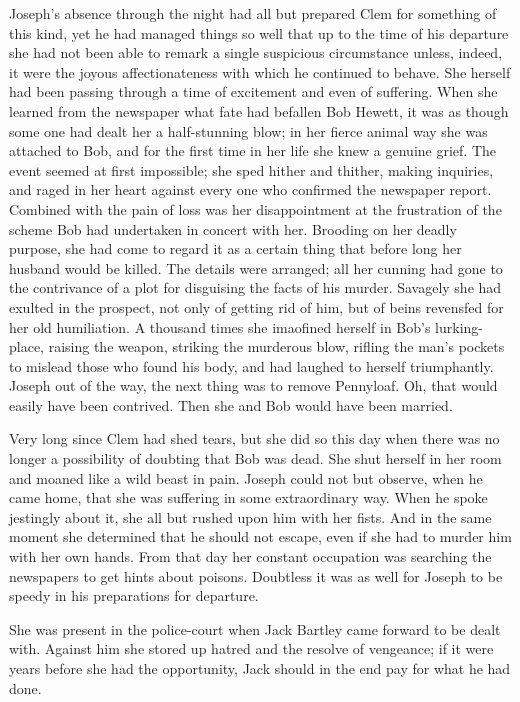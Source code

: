 Joseph's absence through the night had all but prepared Clem for
something of this kind, yet he had managed things so well that up to the
time of his departure she had not been able to remark a single
suspicious circumstance {}unless, indeed, it were the joyous
affectionateness with which he continued to behave. She herself had been
passing through a time of excitement and even of suffering. When she
learned from the newspaper what fate had befallen Bob Hewett, it was as
though some one had dealt her a half-stunning blow; in her fierce animal
way she was attached to Bob, and for the first time in her life she knew
a genuine grief. The event seemed at first impossible; she sped hither
and thither, making inquiries, and raged in her heart against every one
who confirmed the newspaper report. Combined with the pain of loss was
her disappointment at the frustration of the scheme Bob had undertaken
in concert with her. Brooding on her deadly purpose, she had come to
regard it as a certain thing that before long her husband would be
killed. The details were arranged; all her cunning had gone to the
contrivance of a plot for disguising the facts of his murder. Savagely
she had exulted in the prospect, not only of getting rid of him, but of
beins revensfed for her old humiliation. A thousand times she imaofined
herself in Bob's lurking-place, raising the weapon, {}striking the
murderous blow, rifling the man's pockets to mislead those who found his
body, and had laughed to herself triumphantly. Joseph out of the way,
the next thing was to remove Pennyloaf. Oh, that would easily have been
contrived. Then she and Bob would have been married.

Very long since Clem had shed tears, but she did so this day when there
was no longer a possibility of doubting that Bob was dead. She shut
herself in her room and moaned like a wild beast in pain. Joseph could
not but observe, when he came home, that she was suffering in some
extraordinary way. When he spoke jestingly about it, she all but rushed
upon him with her fists. And in the same moment she determined that he
should not escape, even if she had to murder him with her own hands.
From that day her constant occupation was searching the newspapers to
get hints about poisons. Doubtless it was as well for Joseph to be
speedy in his preparations for departure.

She was present in the police-court when Jack Bartley came forward to be
dealt with. Against him she stored up hatred and the {}resolve of
vengeance; if it were years before she had the opportunity, Jack should
in the end pay for what he had done.

